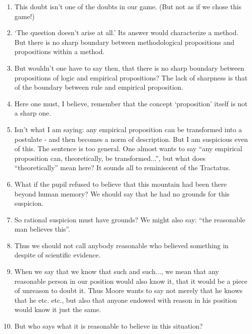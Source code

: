\documentclass{book}
\begin{document}
\begin{enumerate}
\item
This doubt isn't one of the doubts in our game. (But not as if we chose this
game!)

\item
`The question doesn't arise at all.' Its answer would characterize a method.
But there is no sharp boundary between methodological propositions and
propositions within a method.

\item
But wouldn't one have to say then, that there is no sharp boundary between
propositions of logic and empirical propositions? The lack of sharpness is that
of the boundary between rule and empirical proposition.

\item
Here one must, I believe, remember that the concept `proposition' itself is not
a sharp one.

\item
Isn't what I am saying: any empirical proposition can be transformed into a
postulate - and then becomes a norm of description. But I am suspicious even of
this. The sentence is too general. One almost wants to say ``any empirical
proposition can, theoretically, be transformed...'', but what does
``theoretically'' mean here? It sounds all to reminiscent of the Tractatus.

\item
What if the pupil refused to believe that this mountain had been there beyond
human memory?  We should say that he had no grounds for this suspicion.

\item
So rational suspicion must have grounds?  We might also say: ``the reasonable
man believes this''.

\item
Thus we should not call anybody reasonable who believed something in despite of
scientific evidence.

\item
When we say that we know that such and such..., we mean that any reasonable
person in our position would also know it, that it would be a piece of unreason
to doubt it. Thus Moore wants to say not merely that he knows that he etc.
etc., but also that anyone endowed with reason in his position would know it
just the same.

\item
But who says what it is reasonable to believe in this situation?


\end{enumerate}
\end{document}
